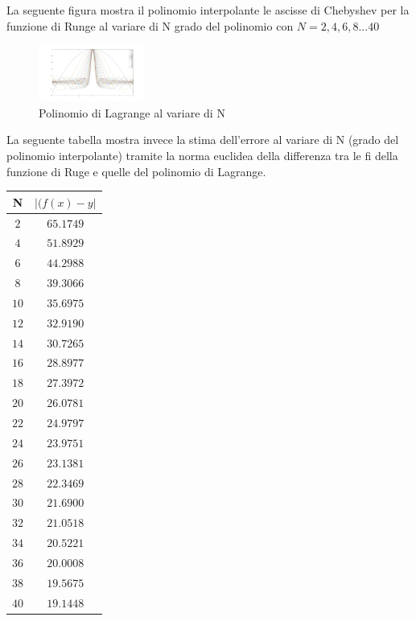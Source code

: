 

La seguente figura mostra il polinomio interpolante le ascisse
di Chebyshev per la funzione di Runge al variare di N grado del polinomio con
$N=2,4,6,8...40$
\\
\begin{figure}[H]
  \label{Cap_4_Es_7(2)}
  \includegraphics[left, width=130px]{Plot/Cap_4_Es_7(2)}
    \caption{Polinomio di Lagrange al variare di N}
\end{figure}
La seguente tabella mostra invece la stima dell'errore al variare di N (grado del polinomio interpolante) tramite la norma euclidea 
della differenza tra le fi della funzione di Ruge e quelle del polinomio di Lagrange.

\begin{center}
	\begin{tabular}{|c|c|}
		\hline
			N & $|(f(x)-y|$ \\
    \hline
    $2$  & $65.1749$ \\
    $4$  & $51.8929$ \\
    $6$  & $44.2988$ \\
    $8$  & $39.3066$ \\
    $10$ & $35.6975$ \\
    $12$ & $32.9190$ \\
    $14$ & $30.7265$ \\
    $16$ & $28.8977$ \\
    $18$ & $27.3972$ \\
    $20$ & $26.0781$ \\
    $22$ & $24.9797$ \\
    $24$ & $23.9751$ \\
    $26$ & $23.1381$ \\
    $28$ & $22.3469$ \\
    $30$ & $21.6900$ \\
    $32$ & $21.0518$ \\
    $34$ & $20.5221$ \\
    $36$ & $20.0008$ \\
    $38$ & $19.5675$ \\
    $40$ & $19.1448$ \\
		\hline
	\end{tabular}
\end{center} 